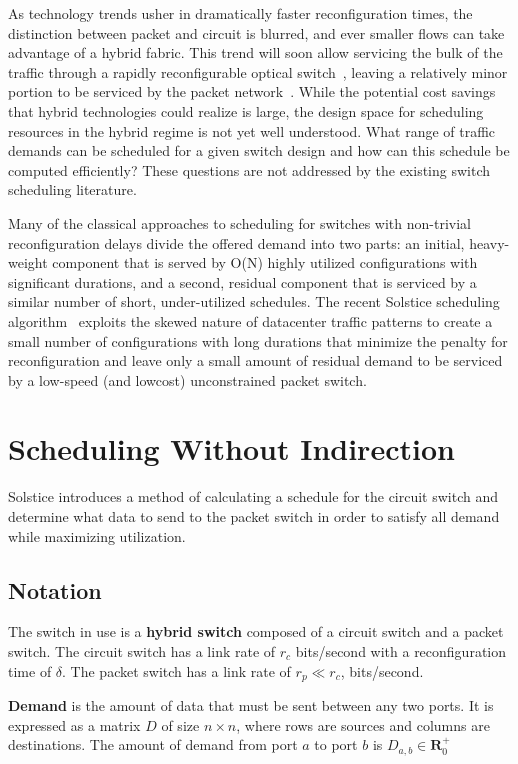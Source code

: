 As technology trends usher in dramatically faster reconfiguration times,
the distinction between packet and circuit is blurred, and ever smaller
flows can take advantage of a hybrid fabric. This trend will soon allow
servicing the bulk of the traffic through a rapidly reconfigurable
optical switch~\cite{Porter:2013}, leaving a relatively minor portion to
be serviced by the packet network~\cite{Liu:2014}. While the potential
cost savings that hybrid technologies could realize is large, the design
space for scheduling resources in the hybrid regime is not yet well
understood. What range of traffic demands can be scheduled for a given
switch design and how can this schedule be computed efficiently? These
questions are not addressed by the existing switch scheduling literature.

Many of the classical approaches to scheduling for switches with
non-trivial reconfiguration delays divide the offered demand into two
parts: an initial, heavy-weight component that is served by O(N) highly
utilized configurations with significant durations, and a second,
residual component that is serviced by a similar number of short,
under-utilized schedules. The recent Solstice scheduling algorithm~\cite{Liu:2015}
exploits the skewed nature of datacenter traffic
patterns to create a small number of configurations with long durations
that minimize the penalty for reconfiguration and leave only a small
amount of residual demand to be serviced by a low-speed (and lowcost)
unconstrained packet switch.

\section{Scheduling Without Indirection}
\label{sec:noindirection}
Solstice introduces a method of calculating a schedule for the circuit switch
and determine what data to send to the packet switch in order to satisfy all
demand while maximizing utilization.

\subsection{Notation}
The switch in use is a \textbf{hybrid switch} composed of
a circuit switch and a packet switch. The circuit switch has
a link rate of $r_c$ bits/second with a reconfiguration time of $\delta$.
The packet switch has a link rate of $r_p \ll r_c$, bits/second.

\textbf{Demand} is the amount of data that must be sent between any two ports.
It is expressed as a matrix $D$ of size $n \times n$,
where rows are sources and columns are destinations.
The amount of demand from port $a$ to port $b$ is $D_{a, b} \in \mathbf{R}^{+}_0$

